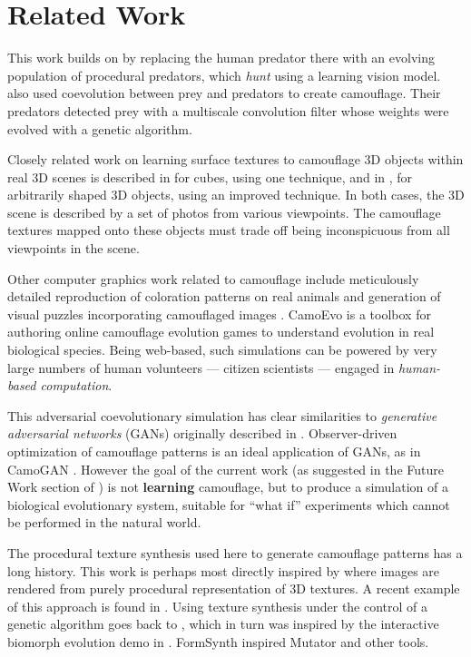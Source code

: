 \documentclass[acmtog,
    anonymous,
    review
    ]{acmart}
\newcommand{\jargon}[1]{\textit{#1}}
\begin{document}
\section{Related Work}
This work builds on \citet{reynolds_iec_2011} by replacing the human predator there with an evolving population of procedural predators, which \jargon{hunt} using a learning vision model. \citet{harrington_coevolution_2014} also used coevolution between prey and predators to create camouflage. Their predators detected prey with a multiscale convolution filter whose weights were evolved with a genetic algorithm.
\par
Closely related work on learning surface textures to camouflage 3D objects within real 3D scenes is described in \citet{owens_camouflaging_2014} for cubes, using one technique, and in \citet{guo_ganmouflage_2022}, for arbitrarily shaped 3D objects, using an improved technique. In both cases, the 3D scene is described by a set of photos from various viewpoints. The camouflage textures mapped onto these objects must trade off being inconspicuous from all viewpoints in the scene.
\par
Other computer graphics work related to camouflage include meticulously detailed reproduction of coloration patterns on real animals \cite{de_gomensoro_malheiros_leopard_2020} and generation of visual puzzles incorporating camouflaged images \cite{chu_camo_image_2010} \cite{Zhang_Yin_Nie_Zheng_2020}. CamoEvo \cite{hancock_camoevo_2022} is a toolbox for authoring online camouflage evolution games to understand evolution in real biological species. Being web-based, such simulations can be powered by very large numbers of human volunteers — citizen scientists — engaged in \jargon{human-based computation}.
\par
This adversarial coevolutionary simulation has clear similarities to \jargon{generative adversarial networks} (GANs) originally described in \citet{goodfellow_gan_2014}. Observer-driven optimization of camouflage patterns is an ideal application of GANs, as in CamoGAN \cite{talas_camogan_2020}. However the goal of the current work (as suggested in the Future Work section of \citet{reynolds_iec_2011}) is not \textbf{learning} camouflage, but to produce a simulation of a biological evolutionary system, suitable for “what if” experiments which cannot be performed in the natural world.
\par
The procedural texture synthesis used here to generate camouflage patterns has a long history. This work is perhaps most directly inspired by \citet{perlin_image_1985} where images are rendered from purely procedural representation of 3D textures. A recent example of this approach is found in \citet{Guerrero_MatFormer_2022}. Using texture synthesis under the control of a genetic algorithm goes back to \citet{sims_artificial_1991}, which in turn was inspired by the interactive biomorph evolution demo in \citet{dawkins_blind_1986}. FormSynth \cite{latham_form_1989} inspired Mutator \cite{todd_evolutionary_1994} and other tools.
\end{document}
